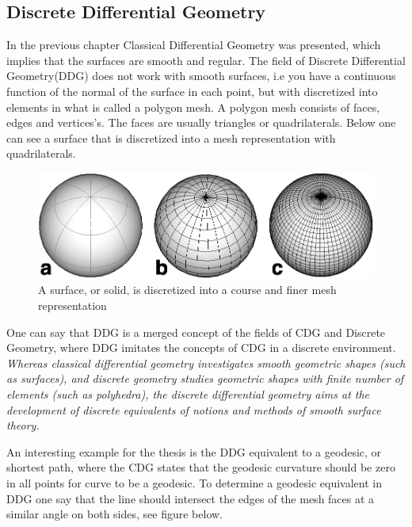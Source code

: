 \subsection{Discrete Differential Geometry}

In the previous chapter Classical Differential Geometry was presented, which implies that the surfaces are smooth and regular. The field of Discrete Differential Geometry(DDG) does not work with smooth surfaces, i.e you have a continuous function of the normal of the surface in each point, but with discretized into elements in what is called a polygon mesh. A polygon mesh consists of faces, edges and vertices's. The faces are usually triangles or quadrilaterals. Below one can see a surface that  is discretized into a mesh representation with quadrilaterals.


\begin{figure}[H]
\centering
\includegraphics[width=0.6\linewidth ]{figure/Theory/polygonMesh.jpeg}
\caption{A surface, or solid, is discretized into a course and finer mesh representation}
\end{figure}

One can say that DDG is a merged concept of the fields of CDG and Discrete Geometry, where DDG imitates the concepts of CDG in a discrete environment.
\textit{ Whereas classical differential
geometry investigates smooth geometric shapes (such as surfaces), and
discrete geometry studies geometric shapes with finite number of elements
(such as polyhedra), the discrete differential geometry aims at the development
of discrete equivalents of notions and methods of smooth surface
theory.} \cite{ref:discrete}

An interesting example for the thesis is the DDG equivalent to a geodesic, or shortest path,  where the CDG states that the geodesic curvature should be zero in all points for curve to be a geodesic. To determine a geodesic equivalent in DDG one say that the line should intersect the edges of the mesh faces at a similar angle on both sides\cite{ref:ArchGeometry}, see figure below.

